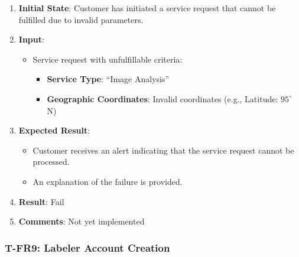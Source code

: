 \documentclass[12pt, titlepage]{article}
\begin{document}
\begin{enumerate}

    \item \textbf{Initial State}: Customer has initiated a service request that cannot be fulfilled due to invalid parameters.
    \item \textbf{Input}:
    \begin{itemize}
        \item Service request with unfulfillable criteria:
        \begin{itemize}
            \item \textbf{Service Type}: ``Image Analysis''
            \item \textbf{Geographic Coordinates}: Invalid coordinates (e.g., Latitude: $95^\circ$ N)
        \end{itemize}
    \end{itemize}
    
        \item \textbf{Expected Result}:
        \begin{itemize}
            \item Customer receives an alert indicating that the service request cannot be processed.
            \item An explanation of the failure is provided.
        \end{itemize}
        \item \textbf{Result}: Fail
        \item \textbf{Comments}: Not yet implemented
\end{enumerate}

\subsubsection*{T-FR9: Labeler Account Creation}
\end{document}
